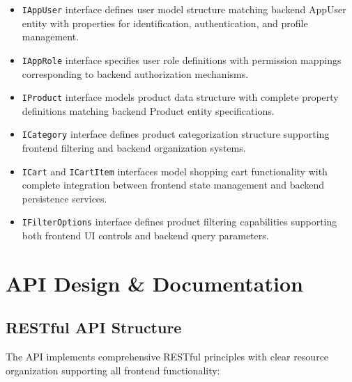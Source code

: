 \documentclass[12pt,a4paper]{article}
\begin{document}
\begin{itemize}
    \item \texttt{IAppUser} interface defines user model structure matching backend AppUser entity with properties for identification, authentication, and profile management.
    \item \texttt{IAppRole} interface specifies user role definitions with permission mappings corresponding to backend authorization mechanisms.
    \item \texttt{IProduct} interface models product data structure with complete property definitions matching backend Product entity specifications.
    \item \texttt{ICategory} interface defines product categorization structure supporting frontend filtering and backend organization systems.
    \item \texttt{ICart} and \texttt{ICartItem} interfaces model shopping cart functionality with complete integration between frontend state management and backend persistence services.
    \item \texttt{IFilterOptions} interface defines product filtering capabilities supporting both frontend UI controls and backend query parameters.
\end{itemize}

\section{API Design \& Documentation}

\subsection{RESTful API Structure}

The API implements comprehensive RESTful principles with clear resource organization supporting all frontend functionality:
\end{document}
